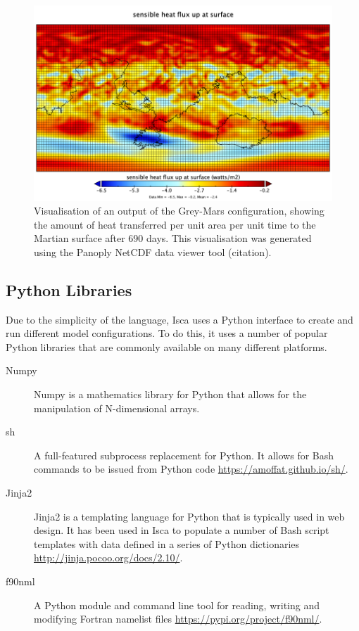 \documentclass[a4paper,11pt]{report}
\begin{document}
\begin{figure}[htbp]
\begin{center}
\includegraphics[width=\textwidth]{img/flux_t_in_atmos_daily.png}
\caption[Visual output from the Isca model]{Visualisation of an output of the Grey-Mars configuration, showing the amount of heat transferred per unit area per unit time to the Martian surface after 690 days. This visualisation was generated using the Panoply NetCDF data viewer tool (citation).}
\label{fig:netcdf}
\end{center}
\end{figure}


\subsection{Python Libraries}
Due to the simplicity of the language, Isca uses a Python interface to create and run different model configurations. To do this, it uses a number of popular Python libraries that are commonly available on many different platforms.

\begin{description}
	\item[Numpy] Numpy is a mathematics library for Python that allows for the manipulation of N-dimensional arrays.
	
	\item[sh] A full-featured subprocess replacement for Python. It allows for Bash commands to be issued from Python code \url{https://amoffat.github.io/sh/}. 
	
	\item[Jinja2] Jinja2 is a templating language for Python that is typically used in web design. It has been used in Isca to populate a number of Bash script templates with data defined in a series of Python dictionaries \url{http://jinja.pocoo.org/docs/2.10/}. 
	
	\item[f90nml] A Python module and command line tool for reading, writing and modifying Fortran namelist files \url{https://pypi.org/project/f90nml/}. 
	
\end{description}
\end{document}
